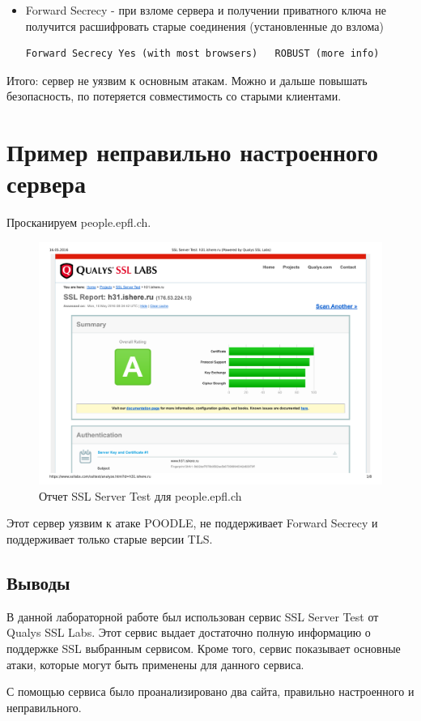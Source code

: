 \begin{itemize}
	\item Forward Secrecy - при взломе сервера и получении приватного ключа не получится расшифровать старые соединения (установленные до взлома)
	\begin{lstlisting}
Forward Secrecy	Yes (with most browsers)   ROBUST (more info)
	\end{lstlisting}
\end{itemize}

Итого: сервер не уязвим к основным атакам. Можно и дальше повышать безопасность, по потеряется совместимость со старыми клиентами.

\section{Пример неправильно настроенного сервера}

Просканируем people.epfl.ch.

\begin{figure}[H]
	\centering
	\includegraphics[width=\textwidth]{test1.pdf}
	\caption{Отчет SSL Server Test для people.epfl.ch}
\end{figure}

Этот сервер уязвим к атаке POODLE, не поддерживает Forward Secrecy и поддерживает только старые версии TLS.

\subsection{Выводы}
В данной лабораторной работе был использован сервис SSL Server Test от Qualys SSL Labs. Этот сервис выдает достаточно полную информацию о поддержке SSL выбранным сервисом. Кроме того, сервис показывает основные атаки, которые могут быть применены для данного сервиса.

С помощью сервиса было проанализировано два сайта, правильно настроенного и неправильного.